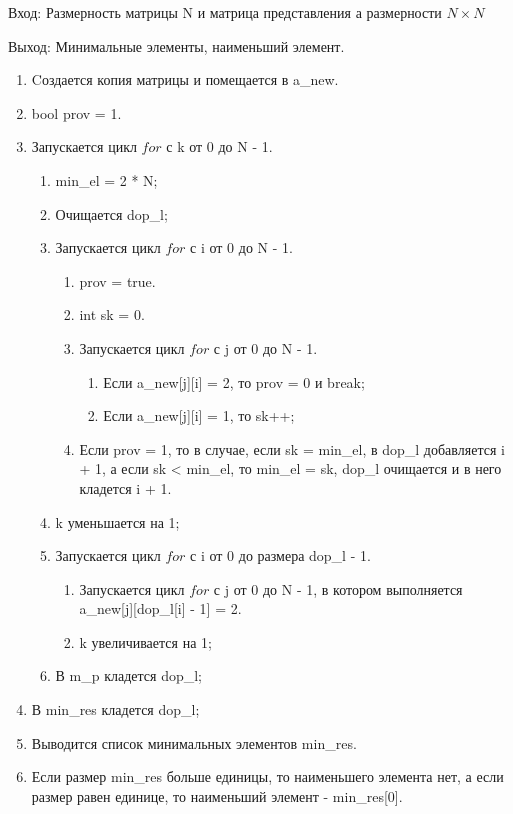\documentclass[bachelor, och, labwork]{shiza}
\begin{document}
	$\textit{Вход:}$ Размерность матрицы N и матрица представления а размерности $N \times N$
	
	$\textit{Выход:}$  Минимальные элементы, наименьший элемент.

	\begin{enumerate} 
		\item Cоздается копия матрицы и помещается в a\_new.
		\item bool prov = 1.
		\item Запускается цикл $for$ с k от 0 до N - 1.
		\begin{enumerate} 
		\item  min\_el = 2 * N;
		\item Очищается dop\_l;
		\item Запускается цикл $for$ с i от 0 до N - 1.
			\begin{enumerate} 
				\item prov = true.
				\item int sk = 0.
				\item Запускается цикл $for$ с j от 0 до N - 1.
					\begin{enumerate} 
						\item Если a\_new[j][i] = 2, то prov = 0 и break;
						\item Если a\_new[j][i] = 1, то sk++;
					\end{enumerate}
				\item Если prov = 1, то в случае, если sk = min\_el, в dop\_l добавляется i + 1, а если sk < min\_el, то min\_el = sk, dop\_l очищается и в него кладется i + 1.
			\end{enumerate}
		\item k уменьшается на 1;
		\item Запускается цикл $for$ с i от 0 до размера dop\_l - 1.
			\begin{enumerate}  
				\item Запускается цикл $for$ с j от 0 до N - 1, в котором выполняется a\_new[j][dop\_l[i] - 1] = 2.
				\item k увеличивается на 1;
			\end{enumerate}
		\item В m\_p кладется dop\_l;
		\end{enumerate}
		\item В min\_res кладется dop\_l;
		\item Выводится список минимальных элементов min\_res.
		\item Если размер min\_res больше единицы, то наименьшего элемента нет, а если размер равен единице, то наименьший элемент - min\_res[0].
	\end{enumerate} 
\end{document}
